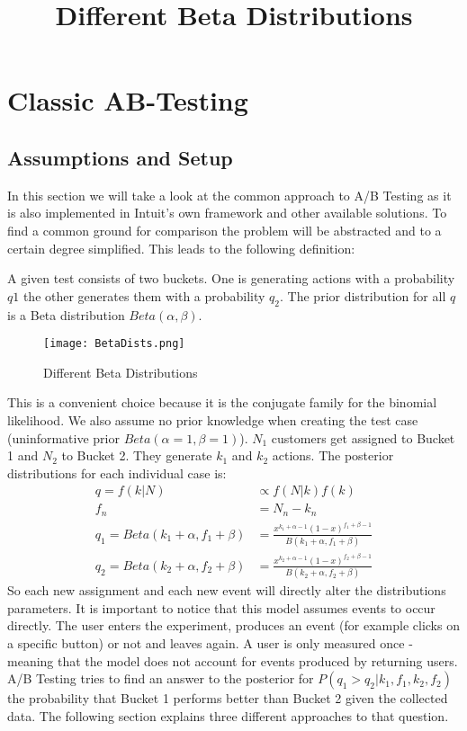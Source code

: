 \documentclass[../Thesis.tex]{subfiles}
\begin{document}
\chapter{Classic AB-Testing}
\section{Assumptions and Setup}
In this section we will take a look at the common approach to A/B Testing as it is also implemented in Intuit's own framework and other available solutions. To find a common ground for comparison the problem will be abstracted and to a certain degree simplified. This leads to the following definition:

A given test consists of two buckets. One is generating actions with a probability $q1$ the other generates them with a probability $q_2$. The prior distribution for all $q$ is a Beta distribution $Beta(\alpha,\beta)$.
\begin{figure}[h]
\texttt{[image: BetaDists.png]}
\centering
\title{Different Beta Distributions}
\caption{Different Beta Distributions}
\end{figure}
This is a convenient choice because it is the conjugate family for the binomial likelihood. 
We also assume no prior knowledge when creating the test case (uninformative prior $Beta(\alpha=1,\beta=1)$). $N_1$ customers get assigned to Bucket 1 and $N_2$ to Bucket 2. They generate $k_1$ and $k_2$ actions. The posterior distributions for each individual case is:
\begin{align*}
q = f(k|N) &\propto f(N|k)f(k)\\
f_n &= N_n-k_n \\
q_1 = Beta(k_1+\alpha,f_1+\beta) & = \frac{x^{k_1+\alpha-1}(1-x)^{f_1+\beta -1}}{B(k_1+\alpha,f_1+\beta)} \\
q_2 = Beta(k_2+\alpha,f_2+\beta) & = \frac{x^{k_2+\alpha-1}(1-x)^{f_2+\beta -1}}{B(k_2+\alpha,f_2+\beta)}
\end{align*}
So each new assignment and each new event will directly alter the distributions parameters. It is important to notice that this model assumes events to occur directly. The user enters the experiment, produces an event (for example clicks on a specific button) or not and leaves again. A user is only measured once - meaning that the model does not account for events produced by returning users.
A/B Testing tries to find an answer to the posterior for $P(q_1>q_2 | k_1,f_1,k_2,f_2)$ the probability that Bucket 1 performs better than Bucket 2 given the collected data. The following section explains three different approaches to that question.
\end{document}
